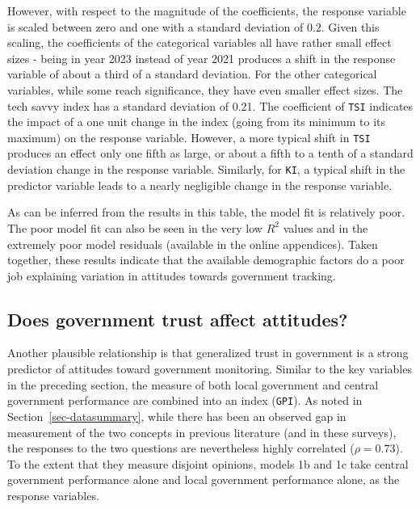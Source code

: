 \documentclass[
  letterpaper,
  DIV=11,
  numbers=noendperiod]{scrartcl}
\begin{document}
However, with respect to the magnitude of the coefficients, the response
variable is scaled between zero and one with a standard deviation of
0.2. Given this scaling, the coefficients of the categorical variables
all have rather small effect sizes - being in year 2023 instead of year
2021 produces a shift in the response variable of about a third of a
standard deviation. For the other categorical variables, while some
reach significance, they have even smaller effect sizes. The tech savvy
index has a standard deviation of 0.21. The coefficient of \texttt{TSI}
indicates the impact of a one unit change in the index (going from its
minimum to its maximum) on the response variable. However, a more
typical shift in \texttt{TSI} produces an effect only one fifth as
large, or about a fifth to a tenth of a standard deviation change in the
response variable. Similarly, for \texttt{KI}, a typical shift in the
predictor variable leads to a nearly negligible change in the response
variable.

As can be inferred from the results in this table, the model fit is
relatively poor. The poor model fit can also be seen in the very low
\(R^2\) values and in the extremely poor model residuals (available in
the online appendices). Taken together, these results indicate that the
available demographic factors do a poor job explaining variation in
attitudes towards government tracking.

\subsection{Does government trust affect
attitudes?}\label{does-government-trust-affect-attitudes}

Another plausible relationship is that generalized trust in government
is a strong predictor of attitudes toward government monitoring. Similar
to the key variables in the preceding section, the measure of both local
government and central government performance are combined into an index
(\texttt{GPI}). As noted in Section~\ref{sec-datasummary}, while there
has been an observed gap in measurement of the two concepts in previous
literature (and in these surveys), the responses to the two questions
are nevertheless highly correlated (\(\rho=0.73\)). To the extent that
they measure disjoint opinions, models 1b and 1c take central government
performance alone and local government performance alone, as the
response variables.
\end{document}
